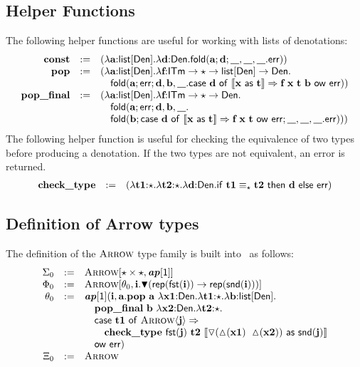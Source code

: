 \documentclass{llncs}
\begin{document}
\subsection{Helper Functions}\label{helper}
The following helper functions are useful for working with lists of denotations:
\[\begin{array}{rcl}
{\textbf{const}} & := & (\lambda {\textbf{a}}{:}{\textsf{list}[\textsf{Den}]}.\lambda {\textbf{d}}{:}{\textsf{Den}}.{\sf fold}({\textbf{a}}; {\textbf{d}}; {\textbf{\_}},{\textbf{\_}},{\textbf{\_}}.{\sf err}))\\
{\textbf{pop}} & := & (\lambda {\textbf{a}}{:}{\textsf{list}[\textsf{Den}]}.\lambda {\textbf{f}}{:}{\textsf{ITm}\rightarrow{\star\rightarrow{\textsf{list}[\textsf{Den}]\rightarrow{\textsf{Den}}}}}.\\& & \quad{\sf fold}({\textbf{a}}; {\sf err}; {\textbf{d}},{\textbf{b}},{\textbf{\_}}.{\sf case}~{\textbf{d}}~{\sf of}~\llbracket {\textbf{x}}~{\sf as}~{\textbf{t}} \rrbracket\Rightarrow
	{\textbf{f}}~{\textbf{x}}~{\textbf{t}}~{\textbf{b}}~{\sf ow}~{\sf err}))\\
{\textbf{pop\_final}} & := & (\lambda {\textbf{a}}{:}{\textsf{list}[\textsf{Den}]}.\lambda {\textbf{f}}{:}{\textsf{ITm}\rightarrow{\star\rightarrow{\textsf{Den}}}}.\\& & \quad{\sf fold}({\textbf{a}}; {\sf err}; {\textbf{d}},{\textbf{b}},{\textbf{\_}}.\\& & \quad {\sf fold}({\textbf{b}}; {\sf case}~{\textbf{d}}~{\sf of}~\llbracket {\textbf{x}}~{\sf as}~{\textbf{t}} \rrbracket\Rightarrow{\textbf{f}}~{\textbf{x}}~{\textbf{t}}~{\sf ow}~{\sf err}; {\textbf{\_}},{\textbf{\_}},{\textbf{\_}}.{\sf err})))
\end{array}\]
\noindent
The following helper function is useful for checking the equivalence of two types before producing a denotation. If the two types are not equivalent, an error is returned.
\[\begin{array}{rcl}
{\textbf{check\_type}} & := & (\lambda {\textbf{t1}}{:}{\star}.\lambda {\textbf{t2}}{:}{\star}.\lambda {\textbf{d}}{:}{\textsf{Den}}.{\sf if}~{\textbf{t1}}\equiv_{\star}{\textbf{t2}}{\sf ~then~}{\textbf{d}}~{\sf else}~{\sf err})
\end{array}\]

\subsection{Definition of Arrow types}
The definition of the $\textsc{Arrow}$ type family is built into \atlam~as follows:
\[
\begin{array}{rcl}
\Sigma_0 & := & \textsc{Arrow}[\star \times \star,\textbf{\textit{ap}}[\textsf{1}]]\\
\Phi_0 & := & \textsc{Arrow}[\theta_0, {\textbf{i}}.\blacktriangledown({\sf rep}({\sf fst}({\textbf{i}}))\rightarrow{\sf rep}({\sf snd}({\textbf{i}})))]\\
\theta_0 & := & \textbf{\textit{ap}}[\textsf{1}]({\textbf{i}},{\textbf{a}}.
	{\textbf{pop}}~{\textbf{a}}~\lambda {\textbf{x1}}{:}{\textsf{Den}}.\lambda {\textbf{t1}}{:}{\star}.\lambda {\textbf{b}}{:}{\textsf{list}[\textsf{Den}]}.
		\\ & & \quad {\textbf{pop\_final}}~{\textbf{b}}~\lambda {\textbf{x2}}{:}{\textsf{Den}}.\lambda {\textbf{t2}}{:}{\star}.
		\\ & & \quad {\sf case}~{\textbf{t1}}~{\sf of}~\textsc{Arrow}\langle{\textbf{j}}\rangle\Rightarrow
		\\ & & \quad \quad {\textbf{check\_type}}~{\sf fst}({\textbf{j}})~{\textbf{t2}}~\llbracket \triangledown(\vartriangle\hspace{-2.5pt}({\textbf{x1}})~\vartriangle\hspace{-2.5pt}({\textbf{x2}}))~{\sf as}~{\sf snd}({\textbf{j}}) \rrbracket
		\\ & & \quad\hspace{-.33em}~{\sf ow}~{\sf err}
		
	
)\\
\Xi_0 & := & \textsc{Arrow}
\end{array}
\]
\end{document}
